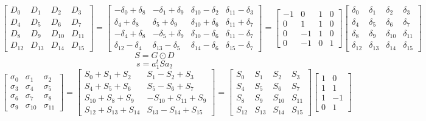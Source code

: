 \documentclass{article}%
\begin{document}
\[%
\left[\begin{matrix}D_{0} & D_{1} & D_{2} & D_{3}\\D_{4} & D_{5} & D_{6} & D_{7}\\D_{8} & D_{9} & D_{10} & D_{11}\\D_{12} & D_{13} & D_{14} & D_{15}\end{matrix}\right] = \left[\begin{matrix}- \delta_{0} + \delta_{8} & - \delta_{1} + \delta_{9} & \delta_{10} - \delta_{2} & \delta_{11} - \delta_{3}\\\delta_{4} + \delta_{8} & \delta_{5} + \delta_{9} & \delta_{10} + \delta_{6} & \delta_{11} + \delta_{7}\\- \delta_{4} + \delta_{8} & - \delta_{5} + \delta_{9} & \delta_{10} - \delta_{6} & \delta_{11} - \delta_{7}\\\delta_{12} - \delta_{4} & \delta_{13} - \delta_{5} & \delta_{14} - \delta_{6} & \delta_{15} - \delta_{7}\end{matrix}\right] = \left[\begin{matrix}-1 & 0 & 1 & 0\\0 & 1 & 1 & 0\\0 & -1 & 1 & 0\\0 & -1 & 0 & 1\end{matrix}\right] \left[\begin{matrix}\delta_{0} & \delta_{1} & \delta_{2} & \delta_{3}\\\delta_{4} & \delta_{5} & \delta_{6} & \delta_{7}\\\delta_{8} & \delta_{9} & \delta_{10} & \delta_{11}\\\delta_{12} & \delta_{13} & \delta_{14} & \delta_{15}\end{matrix}\right]%
\]%
\[%
S = G \odot D%
\]%
\[%
s = a_1^t S a_2%
\]%
\[%
\left[\begin{matrix}\sigma_{0} & \sigma_{1} & \sigma_{2}\\\sigma_{3} & \sigma_{4} & \sigma_{5}\\\sigma_{6} & \sigma_{7} & \sigma_{8}\\\sigma_{9} & \sigma_{10} & \sigma_{11}\end{matrix}\right] = \left[\begin{matrix}S_{0} + S_{1} + S_{2} & S_{1} - S_{2} + S_{3}\\S_{4} + S_{5} + S_{6} & S_{5} - S_{6} + S_{7}\\S_{10} + S_{8} + S_{9} & - S_{10} + S_{11} + S_{9}\\S_{12} + S_{13} + S_{14} & S_{13} - S_{14} + S_{15}\end{matrix}\right] = \left[\begin{matrix}S_{0} & S_{1} & S_{2} & S_{3}\\S_{4} & S_{5} & S_{6} & S_{7}\\S_{8} & S_{9} & S_{10} & S_{11}\\S_{12} & S_{13} & S_{14} & S_{15}\end{matrix}\right] \left[\begin{matrix}1 & 0\\1 & 1\\1 & -1\\0 & 1\end{matrix}\right]%
\]%
\end{document}
